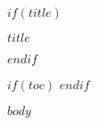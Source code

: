 \documentclass{article}
\begin{document}
$if(title)$
\begin{center}
    {\Huge \textbf{\color{azureblue}$title$} \par}
    \vspace{1cm}
\end{center}
$endif$

$if(toc)$
{
  \hypersetup{linkcolor=azureblue}
  \tableofcontents
  \newpage
}
$endif$

$body$
\end{document}
